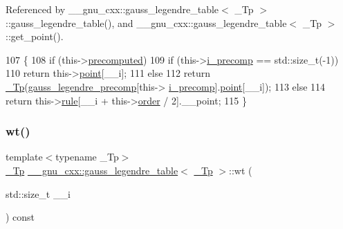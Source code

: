 Referenced by \+\_\+\+\_\+gnu\+\_\+cxx\+::gauss\+\_\+legendre\+\_\+table$<$ \+\_\+\+Tp $>$\+::gauss\+\_\+legendre\+\_\+table(), and \+\_\+\+\_\+gnu\+\_\+cxx\+::gauss\+\_\+legendre\+\_\+table$<$ \+\_\+\+Tp $>$\+::get\+\_\+point().


\begin{DoxyCode}
107     \{
108       \textcolor{keywordflow}{if} (this->\hyperlink{struct____gnu__cxx_1_1gauss__legendre__table_acbcd2eeb79842a232207882c5a4d01c0}{precomputed})
109         \textcolor{keywordflow}{if} (this->\hyperlink{struct____gnu__cxx_1_1gauss__legendre__table_a6f86bbb7d5ed663b88683156a38f4a05}{i\_precomp} == std::size\_t(-1))
110           \textcolor{keywordflow}{return} this->\hyperlink{struct____gnu__cxx_1_1gauss__legendre__table_a2b2ec503ecb0fa74ccdba5b81e4edcd0}{point}[\_\_i];
111         \textcolor{keywordflow}{else}
112           \textcolor{keywordflow}{return} \hyperlink{namespace____gnu__cxx_a3b19a9c800ca194374ef9172290f7d79}{\_Tp}(\hyperlink{namespace____gnu__cxx_a2e3dcc11970f62e2c7e9d81502b2f84b}{gauss\_legendre\_precomp}[this->
      \hyperlink{struct____gnu__cxx_1_1gauss__legendre__table_a6f86bbb7d5ed663b88683156a38f4a05}{i\_precomp}].\hyperlink{struct____gnu__cxx_1_1gauss__legendre__table_a2b2ec503ecb0fa74ccdba5b81e4edcd0}{point}[\_\_i]);
113       \textcolor{keywordflow}{else}
114         \textcolor{keywordflow}{return} this->\hyperlink{struct____gnu__cxx_1_1gauss__legendre__table_a1c1f6c907f2bcee143c39136679901b4}{rule}[\_\_i + this->\hyperlink{struct____gnu__cxx_1_1gauss__legendre__table_aecdc9cdb90f5a7b4f06a455cd868370f}{order} / 2].\_\_point;
115     \}
\end{DoxyCode}
\mbox{\label{struct____gnu__cxx_1_1gauss__legendre__table_affd960260dce4c36ad22f9c34b411bc7}} 
\subsubsection{\texorpdfstring{wt()}{wt()}}
{\footnotesize\ttfamily template$<$typename \+\_\+\+Tp$>$ \\
\hyperlink{namespace____gnu__cxx_a3b19a9c800ca194374ef9172290f7d79}{\+\_\+\+Tp} \hyperlink{struct____gnu__cxx_1_1gauss__legendre__table}{\+\_\+\+\_\+gnu\+\_\+cxx\+::gauss\+\_\+legendre\+\_\+table}$<$ \hyperlink{namespace____gnu__cxx_a3b19a9c800ca194374ef9172290f7d79}{\+\_\+\+Tp} $>$\+::wt (\begin{DoxyParamCaption}\item[{std\+::size\+\_\+t}]{\+\_\+\+\_\+i }\end{DoxyParamCaption}) const}



